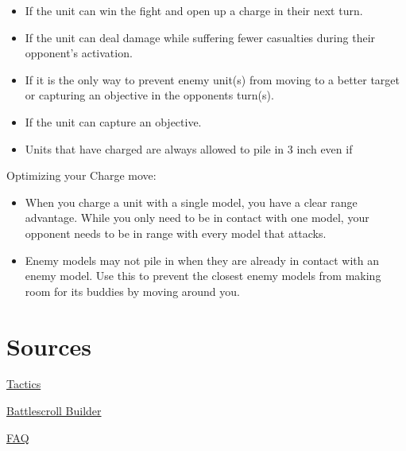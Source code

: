 \begin{itemize}
    \item If the unit can win the fight and open up a charge in their next
        turn.
    \item If the unit can deal damage while suffering fewer casualties during
        their opponent’s activation.
    \item If it is the only way to prevent enemy unit(s) from moving to
        a better target or capturing an objective in the opponents turn(s).
    \item If the unit can capture an objective.
    \item Units that have charged are always allowed to pile in 3 inch even if
\end{itemize}

Optimizing your Charge move:
\begin{itemize}
    \item When you charge a unit with a single model, you have a clear range
        advantage. While you only need to be in contact with one model, your
        opponent needs to be in range with every model that attacks.
    \item Enemy models may not pile in when they are already in contact with an
        enemy model. Use this to prevent the closest enemy models from making
        room for its buddies by moving around you.
\end{itemize}

\section{Sources}
\href{https://1d4chan.org/wiki/Age_of_Sigmar/Tactics/Order/Daughters_of_Khaine}{Tactics}

\href{https://www.warhammer-community.com/warscroll-builder/}{Battlescroll Builder}

\href{https://whc-cdn.games-workshop.com/wp-content/uploads/2018/06/age_of_sigmar_core_rules_designers_commentary_base_sizes_en.pdf}{FAQ}
